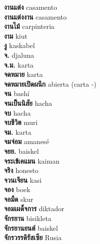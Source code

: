 \textbf{ งานแต่ง  } casamento \\
\textbf{ งานแต่งงาน  } casamento \\
\textbf{ งานไม้  } carpinteria \\
\textbf{ งาม  } kiut \\
\textbf{ งู  } kaskabel \\
\textbf{ จ.  } djaluna \\
\textbf{ จ.ม.  } karta \\
\textbf{ จดหมาย  } karta \\
\textbf{ จดหมายเปิดผนึก  } abierta (carta -) \\
\textbf{ จน  } bashí \\
\textbf{ จนเป็นนิสัย  } hacha \\
\textbf{ จบ  } hacha \\
\textbf{ จบชีวิต  } muri \\
\textbf{ จม.  } karta \\
\textbf{ จมจ่อม  } amanesé \\
\textbf{ จยย.  } baiskel \\
\textbf{ จระเข้เคแมน  } kaiman \\
\textbf{ จริง  } honesto \\
\textbf{ จวนเจียน  } kasi \\
\textbf{ จอง  } boek \\
\textbf{ จอมืด  } skur \\
\textbf{ จอมเผด็จการ  } diktador \\
\textbf{ จักรยาน  } bisikleta \\
\textbf{ จักรยานยนต์  } baiskel \\
\textbf{ จักรวรรดิรัสเซีย  } Rusia \\
